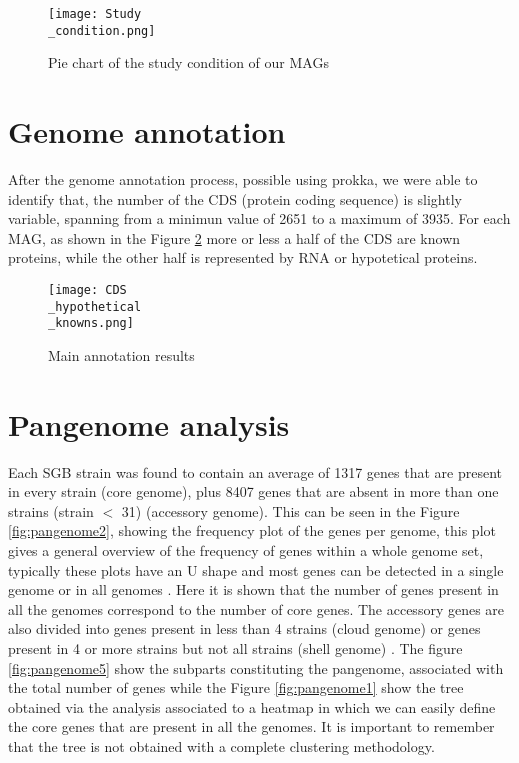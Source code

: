 \documentclass[a4paper,titlepage, oneside]{book}
\begin{document}
\begin{figure}[ht]
\centering
\texttt{[image: Study\\\_condition.png]}
\caption{Pie chart of the study condition of our MAGs}
\label{fig:studyCondition}
\end{figure}

\section{Genome annotation}
After the genome annotation process, possible using prokka, we were able to identify that, the number of the CDS (protein coding sequence) is slightly variable, spanning from a minimun value of 2651 to a maximum of 3935. For each MAG, as shown in the Figure \ref{fig:CDS} more or less a half of the CDS are known proteins, while the other half is represented by RNA or hypotetical proteins.


\begin{figure}[ht]
\centering
\texttt{[image: CDS\\\_hypothetical\\\_knowns.png]}
\caption{Main annotation results}
\label{fig:CDS}
\end{figure}

\section{Pangenome analysis}



Each SGB strain was found to contain an average of 1317 genes that are present in every strain (core genome), plus 8407 genes that are absent in more than one strains (strain $<$ 31) (accessory genome). This can be seen in the Figure \ref{fig:pangenome2}, showing the frequency plot of the genes per genome, this plot gives a general overview of the frequency of genes within a whole genome set, typically these plots have an U shape and most genes can be detected in a single genome or in all genomes \cite{Analysis-roary}. Here it is shown that the number of genes present in all the genomes correspond to the number of core genes.
The accessory genes are also divided into genes present in less than 4 strains (cloud genome) or genes present in 4 or more strains but not all strains (shell genome) \cite{Medini}. The figure \ref{fig:pangenome5} show the subparts constituting the pangenome, associated with the total number of genes while the Figure \ref{fig:pangenome1} show the tree obtained via the analysis associated to a heatmap in which we can easily define the core genes that are present in all the genomes. It is important to remember that the tree is not obtained with a complete clustering methodology.
\end{document}
